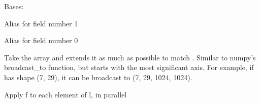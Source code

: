 \documentclass[letterpaper,10pt,english]{sphinxmanual}
\begin{document}
\begin{fulllineitems}
\label{\detokenize{xanespy:xanespy.utilities.Pixel}}
Bases: 

\begin{fulllineitems}
\label{\detokenize{xanespy:xanespy.utilities.Pixel.horizontal}}
Alias for field number 1

\end{fulllineitems}


\begin{fulllineitems}
\label{\detokenize{xanespy:xanespy.utilities.Pixel.vertical}}
Alias for field number 0

\end{fulllineitems}


\end{fulllineitems}


\begin{fulllineitems}
\label{\detokenize{xanespy:xanespy.utilities.broadcast_reverse}}
Take the array and extends it as much as possible to match
. Similar to numpy's broadcast\_to function, but starts with
the most significant axis. For example, if  has shape (7,
29), it can be broadcast to (7, 29, 1024, 1024).

\end{fulllineitems}


\begin{fulllineitems}
\label{\detokenize{xanespy:xanespy.utilities.foreach}}
Apply f to each element of l, in parallel

\end{fulllineitems}
\end{document}
